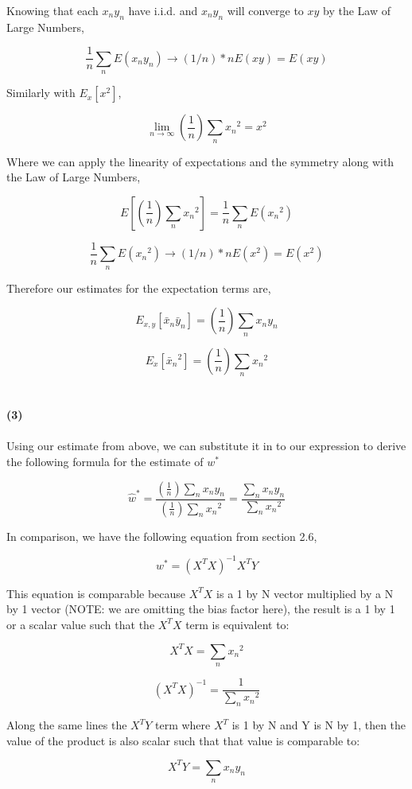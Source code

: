 \documentclass[submit]{harvardml}
\begin{document}
\begin{tcolorbox}[breakable]
Knowing that each $x_n y_n$ have i.i.d. and $x_n y_n$ will converge to $x y$ by the Law of Large Numbers, 

$$ \frac{1}{n} \sum_n E(x_n y_n) \to (1/n)*n E(x y) = E(x y) $$

Similarly with $E_{x}[x^2]$, 

$$\lim_{n \to \infty} (\frac{1}{n})\sum\limits_n {x_n}^2 = x^2$$

Where we can apply the linearity of expectations and the symmetry along with the Law of Large Numbers,

$$ E[(\frac{1}{n})\sum\limits_n {x_n}^2] = \frac{1}{n} \sum_n E({x_n}^2) $$

$$ \frac{1}{n} \sum_n E({x_n}^2) \to (1/n)*n E(x^2) = E(x^2) $$

Therefore our estimates for the expectation terms are,

$$ \boxed{E_{x,y}[\bar{x}_n \bar{y}_n] = \left(\frac{1}{n}\right)\sum\limits_n x_n y_n}$$

$$ \boxed{E_{x}[{\bar{x}_n}^2] = \left(\frac{1}{n}\right)\sum\limits_n {x_n}^2}$$\\\\

\textbf{(3)}\\\\

Using our estimate from above, we can substitute it in to our expression to derive the following formula for the estimate of $w^{*}$

$$ \hat{w}^{*} = \frac{\left(\frac{1}{n}\right)\sum\limits_n x_n y_n}{\left(\frac{1}{n}\right)\sum\limits_n {x_n}^2} = \frac{\sum\limits_n x_n y_n}{\sum\limits_n {x_n}^2}$$

In comparison, we have the following equation from section 2.6,

$$ w^{*} = (X^TX)^{-1}X^TY $$

This equation is comparable because $X^TX$ is a 1 by N vector multiplied by a N by 1 vector (NOTE: we are omitting the bias factor here), the result is a 1 by 1 or a scalar value such that the $X^TX$ term is equivalent to:

$$ X^TX = \sum\limits_n {x_n}^2 $$

$$ (X^TX)^{-1} = \frac{1}{\sum\limits_n {x_n}^2} $$

Along the same lines the $X^TY$ term where $X^T$ is 1 by N and Y is N by 1, then the value of the product is also scalar such that that value is comparable to:

$$ X^TY = \sum\limits_n x_n y_n $$


\end{tcolorbox}
\end{document}
